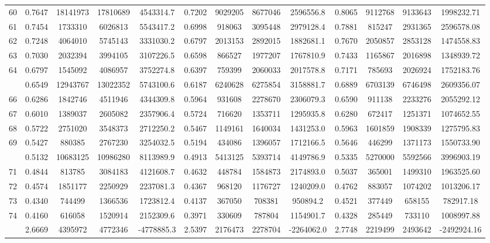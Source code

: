 \documentclass[
  12pt,
]{article}
\begin{document}
\begin{longtable}[t]{lcccccccccccc}
60 & 0.7647 & 18141973 & 17810689 & 4543314.7 & 0.7202 & 9029205 & 8677046 & 2596556.8 & 0.8065 & 9112768 & 9133643 & 1998232.71\\
61 & 0.7454 & 1733310 & 6026813 & 5543417.2 & 0.6998 & 918063 & 3095448 & 2979128.4 & 0.7881 & 815247 & 2931365 & 2596578.08\\
62 & 0.7248 & 4064010 & 5745143 & 3331030.2 & 0.6797 & 2013153 & 2892015 & 1882681.1 & 0.7670 & 2050857 & 2853128 & 1474558.83\\
63 & 0.7030 & 2032394 & 3994105 & 3107226.5 & 0.6598 & 866527 & 1977207 & 1767810.9 & 0.7433 & 1165867 & 2016898 & 1348939.72\\
64 & 0.6797 & 1545092 & 4086957 & 3752274.8 & 0.6397 & 759399 & 2060033 & 2017578.8 & 0.7171 & 785693 & 2026924 & 1752183.76\\
\addlinespace
65 & 0.6549 & 12943767 & 13022352 & 5743100.6 & 0.6187 & 6240628 & 6275854 & 3158881.7 & 0.6889 & 6703139 & 6746498 & 2609356.07\\
66 & 0.6286 & 1842746 & 4511946 & 4344309.8 & 0.5964 & 931608 & 2278670 & 2306079.3 & 0.6590 & 911138 & 2233276 & 2055292.12\\
67 & 0.6010 & 1389037 & 2605082 & 2357906.4 & 0.5724 & 716620 & 1353711 & 1295935.8 & 0.6280 & 672417 & 1251371 & 1074652.55\\
68 & 0.5722 & 2751020 & 3548373 & 2712250.2 & 0.5467 & 1149161 & 1640034 & 1431253.0 & 0.5963 & 1601859 & 1908339 & 1275795.83\\
69 & 0.5427 & 880385 & 2767230 & 3254032.5 & 0.5194 & 434086 & 1396057 & 1712166.5 & 0.5646 & 446299 & 1371173 & 1550733.90\\
\addlinespace
70 & 0.5132 & 10683125 & 10986280 & 8113989.9 & 0.4913 & 5413125 & 5393714 & 4149786.9 & 0.5335 & 5270000 & 5592566 & 3996903.19\\
71 & 0.4844 & 813785 & 3084183 & 4121608.7 & 0.4632 & 448784 & 1584873 & 2174893.0 & 0.5037 & 365001 & 1499310 & 1963525.60\\
72 & 0.4574 & 1851177 & 2250929 & 2237081.3 & 0.4367 & 968120 & 1176727 & 1240209.0 & 0.4762 & 883057 & 1074202 & 1013206.17\\
73 & 0.4340 & 744499 & 1366536 & 1723812.4 & 0.4137 & 367050 & 708381 & 950894.2 & 0.4521 & 377449 & 658155 & 782917.18\\
74 & 0.4160 & 616058 & 1520914 & 2152309.6 & 0.3971 & 330609 & 787804 & 1154901.7 & 0.4328 & 285449 & 733110 & 1008997.88\\
\addlinespace
75 & 2.6669 & 4395972 & 4772346 & -4778885.3 & 2.5397 & 2176473 & 2278704 & -2264062.0 & 2.7748 & 2219499 & 2493642 & -2492924.16\\*
\end{longtable}
\endgroup{}
\end{document}
